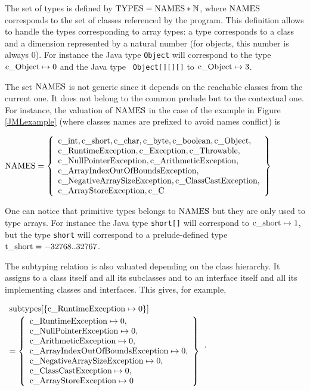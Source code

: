  The set of types is defined by $\rm{TYPES} = \rm{NAMES} * \mathbb{N}$, where $\rm{NAMES}$ corresponds to the set of
classes referenced by the program.
 This definition allows to handle the types corresponding to array types: a type corresponds to a class and a
dimension represented by a natural number (for objects, this number is always 0). For instance the Java type
{\tt \rm{Object}} will correspond to the type $\rm{c\_Object} \mapsto 0$ and the Java type {\tt
\rm{Object}[][][]} to $\rm{c\_Object} \mapsto 3$.

 The set $\rm{NAMES}$ is not generic since it depends on the reachable classes from the current one.
 It does not belong to the common prelude but to the contextual one.
 For instance, the valuation of $\rm{NAMES}$ in the case of the example in Figure \ref{JMLexample} (where classes
names are prefixed to avoid names conflict) is
\begin{center}
$\rm{NAMES} =  \left\{ \begin{array}{l} \rm{c\_int} , \rm{c\_short} ,\rm{c\_char} ,\rm{c\_byte} ,\rm{c\_boolean} ,\rm{c\_Object} ,\\
\rm{c\_RuntimeException}, \rm{c\_Exception} ,\rm{c\_Throwable} , \\
\rm{c\_NullPointerException} ,\rm{c\_ArithmeticException}, \\
\rm{c\_ArrayIndexOutOfBoundsException}, \\
\rm{c\_NegativeArraySizeException}, \rm{c\_ClassCastException} , \\
\rm{c\_ArrayStoreException} ,\rm{c\_C}
 \end{array} \right\}$
\end{center}
 One can notice that primitive types belongs to $\rm{NAMES}$ but they are only used to type arrays. For
instance the Java type {\tt short[]} will correspond to $\rm{c\_short} \mapsto 1$, but the type {\tt short} will
correspond to a prelude-defined type $\rm{t\_short} = -32768..32767$.

The subtyping relation is also valuated depending on the class hierarchy. It assigns to a class itself and all
its subclasses and to an interface itself and all its implementing classes and interfaces.
 This gives, for example,
\begin{center}
$\begin{array}{l}
\rm{subtypes}[\{\rm{c\_RuntimeException} \mapsto 0\}] \\[1 mm]
 = \left\{ \begin{array}{l} \rm{c\_RuntimeException} \mapsto 0,  \\
\rm{c\_NullPointerException} \mapsto 0 , \\ \rm{c\_ArithmeticException} \mapsto 0,   \\
\rm{c\_ArrayIndexOutOfBoundsException} \mapsto 0, \\
\rm{c\_NegativeArraySizeException} \mapsto 0, \\ \rm{c\_ClassCastException} \mapsto 0 , \\
\rm{c\_ArrayStoreException}  \mapsto 0
 \end{array} \right\}
\end{array}$.
\end{center}

